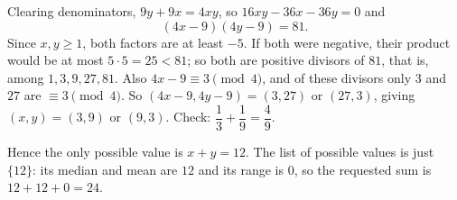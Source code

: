 Clearing denominators, $9y+9x=4xy$, so $16xy-36x-36y=0$ and
\[(4x-9)(4y-9)=81.\]
Since $x,y\ge1$, both factors are at least $-5$. If both were negative, their product would be at most $5\cdot5=25<81$; so both are positive divisors of $81$, that is, among $1,3,9,27,81$. Also $4x-9\equiv3\pmod4$, and of these divisors only $3$ and $27$ are $\equiv3\pmod 4$. So $(4x-9,4y-9)=(3,27)$ or $(27,3)$, giving $(x,y)=(3,9)$ or $(9,3)$. Check: $\dfrac{1}{3}+\dfrac{1}{9}=\dfrac{4}{9}$.

Hence the only possible value is $x+y=\boxed{12}$. The list of possible values is just $\{12\}$: its median and mean are $12$ and its range is $0$, so the requested sum is $12+12+0=\boxed{24}$.
